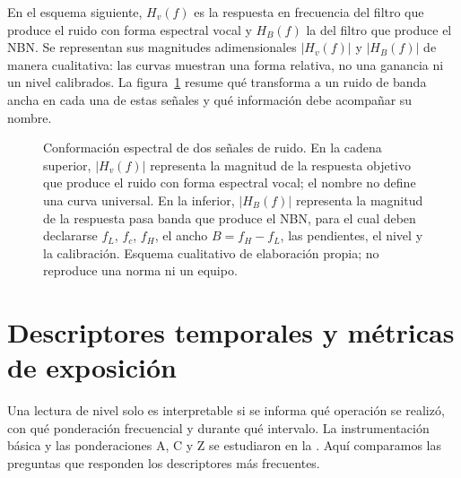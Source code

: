 
En el esquema siguiente, \(H_v(f)\) es la respuesta en frecuencia del filtro
que produce el ruido con forma espectral vocal y \(H_B(f)\) la del filtro que
produce el NBN. Se representan sus magnitudes adimensionales
\(\lvert H_v(f)\rvert\) y \(\lvert H_B(f)\rvert\) de manera cualitativa: las
curvas muestran una forma relativa, no una ganancia ni un nivel calibrados.
La figura~\ref{fig:u10-conformacion-espectral} resume qué transforma a un
ruido de banda ancha en cada una de estas señales y qué información debe
acompañar su nombre.

\begin{figure}[htbp]
    \centering
    
    \caption{Conformación espectral de dos señales de ruido.
    En la cadena superior, \(\lvert H_v(f)\rvert\) representa la magnitud de la
    respuesta objetivo que produce el ruido con forma espectral vocal; el
    nombre no define una curva universal. En la inferior,
    \(\lvert H_B(f)\rvert\) representa la magnitud de la respuesta pasa banda
    que produce el NBN, para el cual deben declararse \(f_L\), \(f_c\), \(f_H\),
    el ancho \(B=f_H-f_L\), las pendientes, el nivel y la calibración. Esquema
    cualitativo de elaboración propia; no reproduce una norma ni un equipo.}
    \label{fig:u10-conformacion-espectral}
\end{figure}

\section{Descriptores temporales y métricas de exposición}
\label{sec:u10-metricas}

Una lectura de nivel solo es interpretable si se informa qué operación se
realizó, con qué ponderación frecuencial y durante qué intervalo. La
instrumentación básica y las ponderaciones A, C y Z se estudiaron en la
. Aquí comparamos las preguntas que responden los
descriptores más frecuentes.

